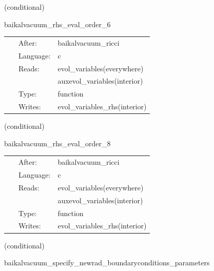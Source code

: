 \vspace{5mm}

   (conditional) 

\hspace{5mm} baikalvacuum\_rhs\_eval\_order\_6 

\hspace{5mm}{\it evaluate bssn rhss, at finite-differencing order 6 } 


\hspace{5mm}

 \begin{tabular*}{160mm}{cll} 
~ & After:  & baikalvacuum\_ricci \\ 
~ & Language:  & c \\ 
~ & Reads:  & evol\_variables(everywhere) \\ 
~& ~ &auxevol\_variables(interior)\\ 
~ & Type:  & function \\ 
~ & Writes:  & evol\_variables\_rhs(interior) \\ 
\end{tabular*} 


\vspace{5mm}

   (conditional) 

\hspace{5mm} baikalvacuum\_rhs\_eval\_order\_8 

\hspace{5mm}{\it evaluate bssn rhss, at finite-differencing order 8 } 


\hspace{5mm}

 \begin{tabular*}{160mm}{cll} 
~ & After:  & baikalvacuum\_ricci \\ 
~ & Language:  & c \\ 
~ & Reads:  & evol\_variables(everywhere) \\ 
~& ~ &auxevol\_variables(interior)\\ 
~ & Type:  & function \\ 
~ & Writes:  & evol\_variables\_rhs(interior) \\ 
\end{tabular*} 


\vspace{5mm}

   (conditional) 

\hspace{5mm} baikalvacuum\_specify\_newrad\_boundaryconditions\_parameters 

